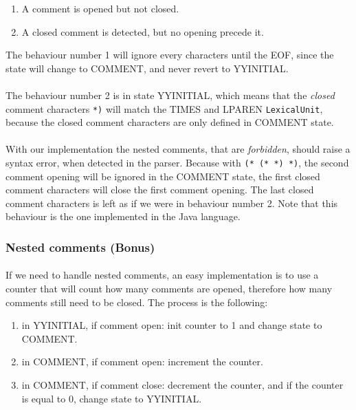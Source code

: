 \documentclass[letterpaper]{article}
\begin{document}
\begin{enumerate}
    \item A comment is opened but not closed.
    \item A closed comment is detected, but no opening precede it.
\end{enumerate}

The behaviour number 1 will ignore every characters until the EOF, since
the state will change to COMMENT, and never revert to YYINITIAL.
\paragraph{}

The behaviour number 2 is in state YYINITIAL,
which means that the \textit{closed}
comment characters \texttt{*)} will match
the TIMES and LPAREN \texttt{LexicalUnit},
because the closed comment characters are only defined in COMMENT state.
\paragraph{}

With our implementation the nested comments, that are \textit{forbidden}, should
raise a syntax error, when detected in the parser. Because with
\texttt{(* (* *) *)}, the second comment opening will be ignored in the
COMMENT state, the first closed comment characters will close the first comment
opening. The last closed comment characters is left as if we were in
behaviour number 2. Note that this behaviour is the one implemented in the Java
language.

\subsubsection{Nested comments (Bonus)}

\paragraph{}
If we need to handle nested comments, an easy implementation is to use a
counter that will count how many comments are opened, therefore how many
comments still need to be closed. The process is the following:
\begin{enumerate}
    \item in YYINITIAL, if comment open: init counter to 1 and change state
    to COMMENT.
    \item in COMMENT, if comment open: increment the counter.
    \item in COMMENT, if comment close: decrement the counter, and
    if the counter is equal to 0, change state to YYINITIAL.
\end{enumerate}
\end{document}
